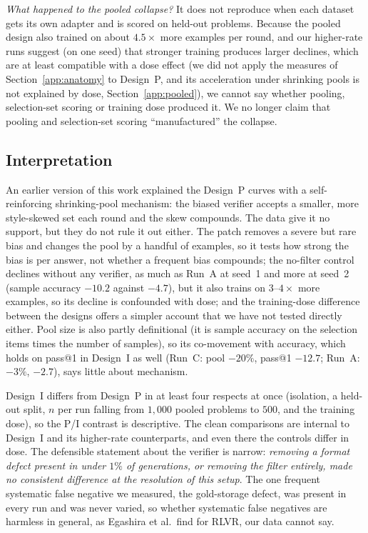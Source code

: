 \documentclass[runningheads]{llncs}
\begin{document}
\emph{What happened to the pooled collapse?} It does not reproduce when each
dataset gets its own adapter and is scored on held-out problems. Because the
pooled design also trained on about $4.5\times$ more examples per round, and our
higher-rate runs suggest (on one seed) that stronger training produces larger
declines, which are at least compatible with a dose effect (we did not apply
the measures of Section~\ref{app:anatomy} to Design~P, and its acceleration
under shrinking pools is not explained by dose, Section~\ref{app:pooled}),
we cannot say whether pooling, selection-set scoring or training dose produced
it. We no longer claim that pooling and selection-set scoring ``manufactured''
the collapse.

\subsection{Interpretation}
An earlier version of this work explained the Design~P curves with a
self-reinforcing shrinking-pool mechanism: the biased verifier accepts a smaller,
more style-skewed set each round and the skew compounds. The data give it no
support, but they do not rule it out either. The patch removes a severe but rare
bias and changes the pool by a handful of examples, so it tests how strong the
bias is per answer, not whether a frequent bias compounds; the no-filter control
declines without any verifier, as much as Run~A at seed~1 and more at seed~2
(sample accuracy $-10.2$ against $-4.7$), but it also trains on $3$--$4\times$
more examples, so its decline is confounded with dose; and the training-dose
difference between the designs offers a simpler account that we have not tested
directly either. Pool size is also partly
definitional (it is sample accuracy on the selection items times the number of
samples), so its co-movement with accuracy, which holds on pass@1 in Design~I as
well (Run~C: pool $-20\%$, pass@1 $-12.7$; Run~A: $-3\%$, $-2.7$), says little
about mechanism.

Design~I differs from Design~P in at least four respects at once (isolation, a
held-out split, $n$ per run falling from $1{,}000$ pooled problems to $500$, and
the training dose), so the P/I contrast is descriptive. The clean comparisons are
internal to Design~I and its higher-rate counterparts, and even there the
controls differ in dose. The defensible statement about the verifier is narrow:
\emph{removing a format defect present in under $1\%$ of generations, or
removing the filter entirely, made no consistent difference at the resolution of
this setup}. The one frequent systematic false negative we measured, the
gold-storage defect, was present in every run and was never varied, so whether
systematic false negatives are harmless in general, as Egashira et al.\ find for
RLVR, our data cannot say.
\end{document}
